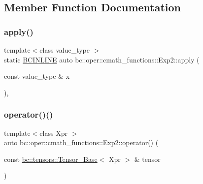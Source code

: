 \subsection{Member Function Documentation}
\mbox{\label{structbc_1_1oper_1_1cmath__functions_1_1Exp2_a06df73a79b1c6e4e74adf06ad6393f12}} 
\subsubsection{\texorpdfstring{apply()}{apply()}}
{\footnotesize\ttfamily template$<$class value\+\_\+type $>$ \\
static \hyperlink{common_8h_a6699e8b0449da5c0fafb878e59c1d4b1}{B\+C\+I\+N\+L\+I\+NE} auto bc\+::oper\+::cmath\+\_\+functions\+::\+Exp2\+::apply (\begin{DoxyParamCaption}\item[{const value\+\_\+type \&}]{x }\end{DoxyParamCaption})\hspace{0.3cm}{\ttfamily [inline]}, {\ttfamily [static]}}

\mbox{\label{structbc_1_1oper_1_1cmath__functions_1_1Exp2_aeaa7aadbace6cde23d28de7bebc53d87}} 
\subsubsection{\texorpdfstring{operator()()}{operator()()}\hspace{0.1cm}{\footnotesize\ttfamily [1/3]}}
{\footnotesize\ttfamily template$<$class Xpr $>$ \\
auto bc\+::oper\+::cmath\+\_\+functions\+::\+Exp2\+::operator() (\begin{DoxyParamCaption}\item[{const \hyperlink{classbc_1_1tensors_1_1Tensor__Base}{bc\+::tensors\+::\+Tensor\+\_\+\+Base}$<$ Xpr $>$ \&}]{tensor }\end{DoxyParamCaption})\hspace{0.3cm}{\ttfamily [inline]}}

